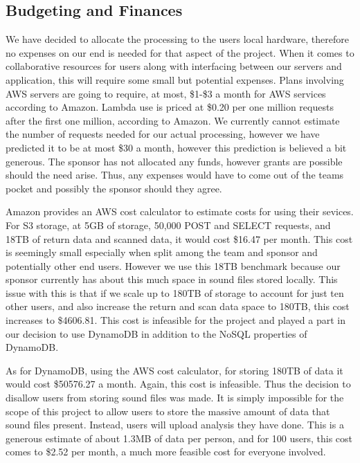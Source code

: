 \subsection{Budgeting and Finances}
We have decided to allocate the processing to the user\textquotesingle s local hardware, therefore no expenses on our end is needed for that aspect of the project. When it comes to collaborative resources for users along with interfacing between our servers and application, this will require some small but potential expenses. Plans involving AWS servers are going to require, at most, \$1-\$3 a month for AWS services according to Amazon. Lambda use is priced at \$0.20 per one million requests after the first one million, according to Amazon. We currently cannot estimate the number of requests needed for our actual processing, however we have predicted it to be at most \$30 a month, however this prediction is believed a bit generous. The sponsor has not allocated any funds, however grants are possible should the need arise. Thus, any expenses would have to come out of the team\textquotesingle s pocket and possibly the sponsor should they agree.\par
Amazon provides an AWS cost calculator to estimate costs for using their sevices. For S3 storage, at 5GB of storage, 50,000 POST and SELECT requests, and 18TB of return data and scanned data, it would cost \$16.47 per month. This cost is seemingly small especially when split among the team and sponsor and potentially other end users. However we use this 18TB benchmark because our sponsor currently has about this much space in sound files stored locally. This issue with this is that if we scale up to 180TB of storage to account for just ten other users, and also increase the return and scan data space to 180TB, this cost increases to \$4606.81. This cost is infeasible for the project and played a part in our decision to use DynamoDB in addition to the NoSQL properties of DynamoDB.\par
As for DynamoDB, using the AWS cost calculator, for storing 180TB of data it would cost \$50576.27 a month. Again, this cost is infeasible. Thus the decision to disallow users from storing sound files was made. It is simply impossible for the scope of this project to allow users to store the massive amount of data that sound files present. Instead, users will upload analysis they have done. This is a generous estimate of about 1.3MB of data per person, and for 100 users, this cost comes to \$2.52 per month, a much more feasible cost for everyone involved.\par
